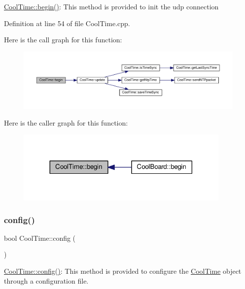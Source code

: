 \hyperlink{class_cool_time_ab1976cf718b950bc31e003c3323b8adb}{Cool\+Time\+::begin()}\+: This method is provided to init the udp connection 

Definition at line 54 of file Cool\+Time.\+cpp.

Here is the call graph for this function\+:
\nopagebreak
\begin{figure}[H]
\begin{center}
\leavevmode
\includegraphics[width=350pt]{class_cool_time_ab1976cf718b950bc31e003c3323b8adb_cgraph}
\end{center}
\end{figure}
Here is the caller graph for this function\+:
\nopagebreak
\begin{figure}[H]
\begin{center}
\leavevmode
\includegraphics[width=296pt]{class_cool_time_ab1976cf718b950bc31e003c3323b8adb_icgraph}
\end{center}
\end{figure}
\mbox{\label{class_cool_time_a87c28260c1bc77091162cbcf1ee2e129}} 
\subsubsection{\texorpdfstring{config()}{config()}\hspace{0.1cm}{\footnotesize\ttfamily [1/2]}}
{\footnotesize\ttfamily bool Cool\+Time\+::config (\begin{DoxyParamCaption}{ }\end{DoxyParamCaption})}

\hyperlink{class_cool_time_a87c28260c1bc77091162cbcf1ee2e129}{Cool\+Time\+::config()}\+: This method is provided to configure the \hyperlink{class_cool_time}{Cool\+Time} object through a configuration file.

